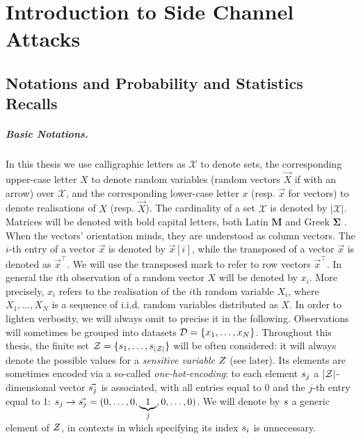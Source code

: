 \chapter{Introduction to Side Channel Attacks} %

\label{ChapterIntroductionSCA}

\section{Notations and Probability and Statistics Recalls}\label{sec:notations}
\paragraph*{Basic Notations.}
In this thesis we use calligraphic letters as $\mathcal{X}$ to denote
sets, the corresponding upper-case letter $X$ to denote random variables (random
vectors $\vec{X}$ if with an arrow) over $\mathcal{X}$, and the corresponding
lower-case letter $x$ (resp. $\vec{x}$ for vectors) to denote realisations of
$X$ (resp. $\vec{X}$). The cardinality of a set $\mathcal{X}$ is denoted by $\lvert\mathcal{X}\rvert$. Matrices will be denoted with bold capital letters, both Latin $\textbf{M}$ and Greek $\boldsymbol{\Sigma}$ . When the vectors' orientation minds, they are understood as column vectors. The
$i$-th entry of a vector $\vec{x}$ is denoted by $\vec{x}[i]$, while the transposed of a vector $\vec{x}$ is denoted as $\vec{x}^\intercal$. We will use the transposed mark to refer to row vectors $\vec{x}^\intercal$. In general the $i$th observation of a random vector $X$ will be denoted by $x_i$. More precisely, $x_i$ refers to the realisation of the $i$th random variable $X_i$, where $X_1, \dots , X_N$ is a sequence of i.i.d. random variables distributed as $X$. In order to lighten verbosity, we will always omit to precise it in the following. Observations will sometimes be grouped into datasets $\mathcal{D}=\{x_1,\dots, x_N\}$. Throughout this thesis, the finite set $\mathcal{Z} = \{s_{1}, \dots, s_{\lvert\mathcal{Z}\rvert}\}$ will be often considered: it will always denote the possible values for a \emph{sensitive variable} $Z$ (see later). Its elements are sometimes encoded via a so-called \emph{one-hot-encoding}: to each element $s_{j}$ a $\lvert\mathcal{Z}\rvert$-dimensional vector  $\vec{s_{j}}$ is associated,
with all entries equal to $0$ and the $j$-th entry equal to $1$: $s_{j}
\rightarrow \vec{s_{j}} = (0,\ldots , 0,\underbrace{1}_{j},0,\dots,0)$. We will denote by $s$ a generic element of $\mathcal{Z}$, in contexts in which specifying its index $s_{i}$ is unnecessary.

